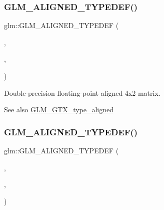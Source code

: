 \subsubsection{\texorpdfstring{G\+L\+M\+\_\+\+A\+L\+I\+G\+N\+E\+D\+\_\+\+T\+Y\+P\+E\+D\+E\+F()}{GLM\_ALIGNED\_TYPEDEF()}\hspace{0.1cm}{\footnotesize\ttfamily [202/209]}}
{\footnotesize\ttfamily glm\+::\+G\+L\+M\+\_\+\+A\+L\+I\+G\+N\+E\+D\+\_\+\+T\+Y\+P\+E\+D\+EF (\begin{DoxyParamCaption}\item[{\hyperlink{group__gtc__type__precision_ga13dbaf75e4f1b18c35d2837067a14ce9}{f64mat4x2}}]{,  }\item[{aligned\+\_\+f64mat4x2}]{,  }\item[{32}]{ }\end{DoxyParamCaption})}

Double-\/precision floating-\/point aligned 4x2 matrix. \begin{DoxySeeAlso}{See also}
\hyperlink{group__gtx__type__aligned}{G\+L\+M\+\_\+\+G\+T\+X\+\_\+type\+\_\+aligned} 
\end{DoxySeeAlso}
\mbox{\label{group__gtx__type__aligned_ga0892638d6ba773043b3d63d1d092622e}} 
\subsubsection{\texorpdfstring{G\+L\+M\+\_\+\+A\+L\+I\+G\+N\+E\+D\+\_\+\+T\+Y\+P\+E\+D\+E\+F()}{GLM\_ALIGNED\_TYPEDEF()}\hspace{0.1cm}{\footnotesize\ttfamily [203/209]}}
{\footnotesize\ttfamily glm\+::\+G\+L\+M\+\_\+\+A\+L\+I\+G\+N\+E\+D\+\_\+\+T\+Y\+P\+E\+D\+EF (\begin{DoxyParamCaption}\item[{\hyperlink{group__gtc__type__precision_gab10a195a85f65da47bf70438f57a8a3c}{f64mat4x3}}]{,  }\item[{aligned\+\_\+f64mat4x3}]{,  }\item[{32}]{ }\end{DoxyParamCaption})}

